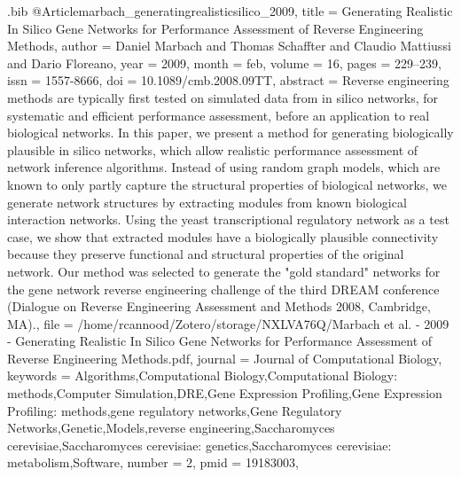 \documentclass[
  table,
  10pt,
  a4paper]{article}
\begin{document}
\begin{filecontents}{\jobname.bib}
@Article{marbach_generatingrealisticsilico_2009,
	title = {Generating {{Realistic In Silico Gene Networks}} for {{Performance Assessment}} of {{Reverse Engineering Methods}}},
	author = {Daniel Marbach and Thomas Schaffter and Claudio Mattiussi and Dario Floreano},
	year = {2009},
	month = {feb},
	volume = {16},
	pages = {229--239},
	issn = {1557-8666},
	doi = {10.1089/cmb.2008.09TT},
	abstract = {Reverse engineering methods are typically first tested on simulated data from in silico networks, for systematic and efficient performance assessment, before an application to real biological networks. In this paper, we present a method for generating biologically plausible in silico networks, which allow realistic performance assessment of network inference algorithms. Instead of using random graph models, which are known to only partly capture the structural properties of biological networks, we generate network structures by extracting modules from known biological interaction networks. Using the yeast transcriptional regulatory network as a test case, we show that extracted modules have a biologically plausible connectivity because they preserve functional and structural properties of the original network. Our method was selected to generate the {"}gold standard{"} networks for the gene network reverse engineering challenge of the third DREAM conference (Dialogue on Reverse Engineering Assessment and Methods 2008, Cambridge, MA).},
	file = {/home/rcannood/Zotero/storage/NXLVA76Q/Marbach et al. - 2009 - Generating Realistic In Silico Gene Networks for Performance Assessment of Reverse Engineering Methods.pdf},
	journal = {Journal of Computational Biology},
	keywords = {Algorithms,Computational Biology,Computational Biology: methods,Computer Simulation,DRE,Gene Expression Profiling,Gene Expression Profiling: methods,gene regulatory networks,Gene Regulatory Networks,Genetic,Models,reverse engineering,Saccharomyces cerevisiae,Saccharomyces cerevisiae: genetics,Saccharomyces cerevisiae: metabolism,Software},
	number = {2},
	pmid = {19183003},
}


\end{filecontents}
\end{document}
